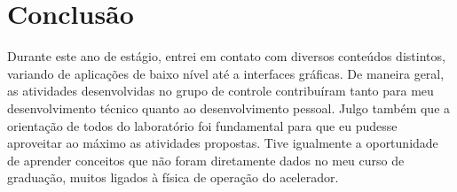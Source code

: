 \section{Conclusão}

Durante este ano de estágio, entrei em contato com diversos conteúdos distintos,
variando de aplicações de baixo nível até a interfaces gráficas. De maneira
geral, as atividades desenvolvidas no grupo de controle  contribuíram tanto para
meu desenvolvimento técnico quanto ao desenvolvimento pessoal. Julgo também que
a orientação de todos do laboratório foi fundamental para que eu pudesse
aproveitar ao máximo as atividades propostas. Tive igualmente a oportunidade de
aprender conceitos que não foram diretamente dados no meu curso de graduação,
muitos ligados à física de operação do acelerador.
